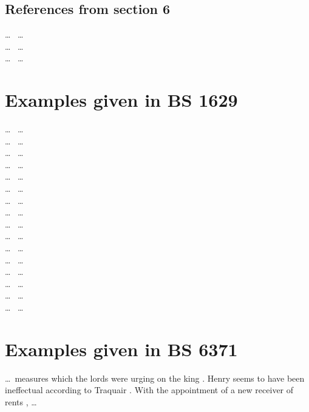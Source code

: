 \section{References from section 6}
 
\dots\ \cite{fletcher-hopkins} \dots\\
%
\dots\ \cite{wright-63} \dots\\
%
\dots\ \cite{feigl-58} \dots\\
 
\chapter{Examples given in BS 1629}
 
\dots\ \cite{hoel-71-whole} \dots\\
%
\dots\ \cite{hoel-71-portion} \dots\\
%
\dots\ \cite{singer-whole} \dots\\
%
\dots\ \cite{singer-portion-chapter} \dots\\
%
\dots\ \cite{singer-portion-volume} \dots\\
%
\dots\ \cite{godfrey-59} \dots\\
%
\dots\ \cite{ramsbottom-31} \dots\\
%
\dots\ \cite{bs-2570-manual} \dots\\
%
\dots\ \cite{bs-2570-techreport} \dots\\
%
\dots\ \cite{bs-2570-inbook} \dots\\
%
\dots\ \cite{ellis-walton} \dots\\
%
\dots\ \cite{hanlon-72} \dots\\
%
\dots\ \cite{winget-67} \dots\\
%
\dots\ \cite{bry-afflerbach} \dots\\
%
\dots\ \cite{ranganathan-51} \dots\\
%
\dots\ \cite{mccolvin-nodate} \dots\\
 
\chapter{Examples given in BS 6371}
 
\dots\ measures which the lords were urging on the king
\cite[fol. 22]{exchequer-34-39}.  Henry seems to have been ineffectual
according to Traquair .  With the appointment of a
new receiver of rents \cite[fol. 2]{exchequer-34-39}, \dots\\
 
